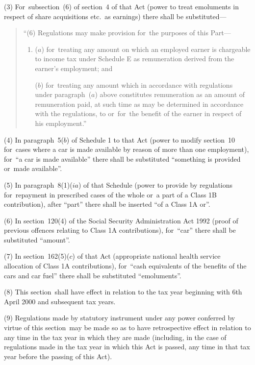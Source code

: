 \documentclass[12pt,a4paper]{article}
\begin{document}
(3) For~subsection~(6)  of section~4 of that Act (power to treat emoluments in respect of share acquisitions etc.\ as earnings) there shall be substituted—
\begin{quotation}
“(6) Regulations may make provision for~the purposes of this Part—
\begin{enumerate}\item[]
($a$) for~treating any amount on which an employed earner is chargeable to income tax under Schedule E as remuneration derived from the earner’s employment; and

($b$) for~treating any amount which in accordance with regulations under paragraph~($a$)  above constitutes remuneration as an amount of remuneration paid, at such time as may be determined in accordance with the regulations, to or~for~the benefit of the earner in respect of his employment.”
\end{enumerate}
\end{quotation}

(4) In paragraph~5($b$)  of Schedule 1 to that Act (power to modify section~10 for~cases where a car is made available by reason of more than one employment), for~“a car is made available” there shall be substituted “something is provided or~made available”.

(5) In paragraph~8(1)($ia$) of that Schedule (power to provide by regulations for~repayment in prescribed cases of the whole or~a part of a Class 1B contribution), after “part” there shall be inserted “of a Class 1A or”.

(6) In section~120(4)  of the Social Security Administration Act 1992 (proof of previous offences relating to Class 1A contributions), for~“car” there shall be substituted “amount”.

(7) In section~162(5)($c$)  of that Act (appropriate national health service allocation of Class 1A contributions), for~“cash equivalents of the benefits of the cars and car fuel” there shall be substituted “emoluments”.

(8) This section~shall have effect in relation to the tax year beginning with 6th April 2000 and subsequent tax years.

(9) Regulations made by statutory instrument under any power conferred by virtue of this section~may be made so as to have retrospective effect in relation to any time in the tax year in which they are made (including, in the case of regulations made in the tax year in which this Act is passed, any time in that tax year before the passing of this Act).
\end{document}
